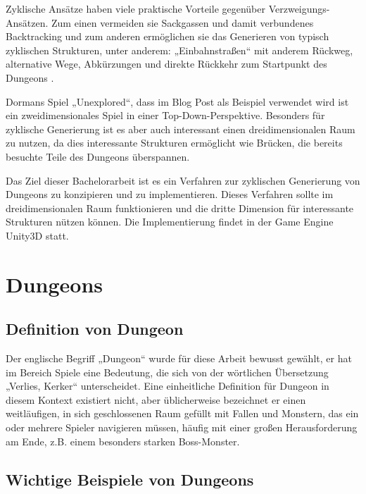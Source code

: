 Zyklische Ansätze haben viele praktische Vorteile gegenüber Verzweigungs-Ansätzen. Zum einen vermeiden sie Sackgassen und damit verbundenes Backtracking und zum anderen ermöglichen sie das Generieren von typisch zyklischen Strukturen, unter anderem: „Einbahnstraßen“ mit anderem Rückweg, alternative Wege, Abkürzungen und direkte Rückkehr zum Startpunkt des Dungeons 
\cite{blogCyclic}.

Dormans Spiel „Unexplored“, dass im Blog Post als Beispiel verwendet wird ist ein zweidimensionales Spiel in einer Top-Down-Perspektive. Besonders für zyklische Generierung ist es aber auch interessant einen dreidimensionalen Raum zu nutzen, da dies interessante Strukturen ermöglicht wie Brücken, die bereits besuchte Teile des Dungeons überspannen.  

Das Ziel dieser Bachelorarbeit ist es ein Verfahren zur zyklischen Generierung von Dungeons zu konzipieren und zu implementieren. Dieses Verfahren sollte im dreidimensionalen Raum funktionieren und die dritte Dimension für interessante Strukturen nützen können. Die Implementierung findet in der Game Engine Unity3D statt.


\section{Dungeons}
\subsection{Definition von Dungeon}

Der englische Begriff „Dungeon“ wurde für diese Arbeit bewusst gewählt, er hat im Bereich Spiele eine Bedeutung, die sich von der wörtlichen Übersetzung „Verlies, Kerker“ unterscheidet. Eine einheitliche Definition für Dungeon in diesem Kontext existiert nicht, aber üblicherweise bezeichnet er einen weitläufigen, in sich geschlossenen Raum gefüllt mit Fallen und Monstern, das ein oder mehrere Spieler navigieren müssen, häufig mit einer großen Herausforderung am Ende, z.B. einem besonders starken Boss-Monster.


\subsection{Wichtige Beispiele von Dungeons}

